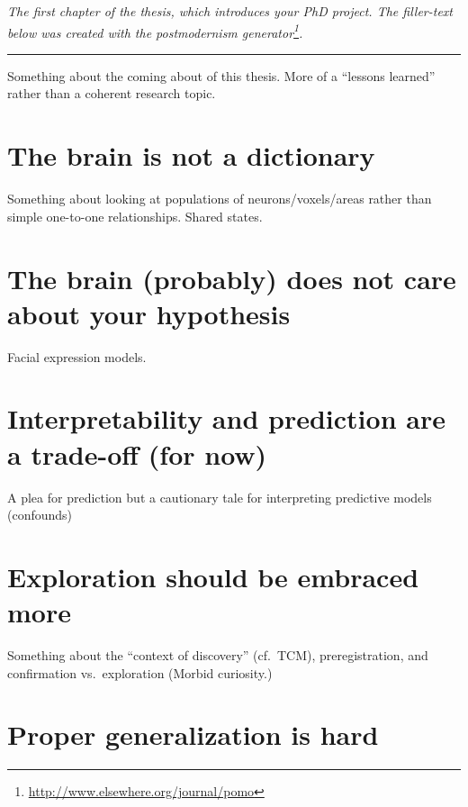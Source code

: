 \documentclass[12pt,american,a4paper,oneside,]{memoir} %
\renewcommand{\href}[2]{#2\footnote{\url{#1}}}
\let\rmarkdownfootnote\footnote%
\def\footnote{\protect\rmarkdownfootnote}
\renewcommand{\href}[2]{#2\footnote{\url{#1}}} %
\begin{document}
\emph{The first chapter of the thesis, which introduces your PhD project. The filler-text below was created with the \href{http://www.elsewhere.org/journal/pomo}{postmodernism generator}.}

\begin{center}\rule{0.5\linewidth}{0.5pt}\end{center}

Something about the coming about of this thesis. More of a ``lessons learned'' rather than a coherent research topic.

\hypertarget{the-brain-is-not-a-dictionary}{%
\section{The brain is not a dictionary}\label{the-brain-is-not-a-dictionary}}

Something about looking at populations of neurons/voxels/areas rather than simple one-to-one relationships. Shared states.

\hypertarget{the-brain-probably-does-not-care-about-your-hypothesis}{%
\section{The brain (probably) does not care about your hypothesis}\label{the-brain-probably-does-not-care-about-your-hypothesis}}

Facial expression models.

\hypertarget{interpretability-and-prediction-are-a-trade-off-for-now}{%
\section{Interpretability and prediction are a trade-off (for now)}\label{interpretability-and-prediction-are-a-trade-off-for-now}}

A plea for prediction but a cautionary tale for interpreting predictive models (confounds)

\hypertarget{exploration-should-be-embraced-more}{%
\section{Exploration should be embraced more}\label{exploration-should-be-embraced-more}}

Something about the ``context of discovery'' (cf.~TCM), preregistration, and confirmation vs.~exploration (Morbid curiosity.)

\hypertarget{proper-generalization-is-hard}{%
\section{Proper generalization is hard}\label{proper-generalization-is-hard}}
\end{document}
